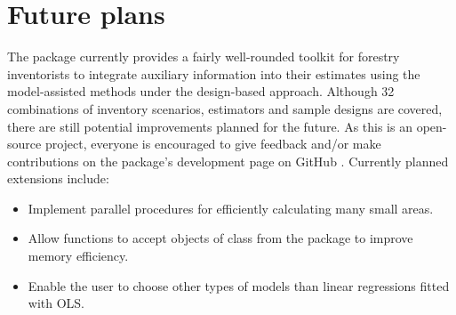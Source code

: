 \documentclass[article]{jss}
\begin{document}
\begin{figure}[h]
\centering
{}
\end{figure}




\newpage

\section{Future plans}
\label{sec:future}

The  package currently provides a fairly well-rounded toolkit for forestry inventorists to integrate auxiliary information into their estimates using the model-assisted methods under the design-based approach.  Although 32 combinations of inventory scenarios, estimators and sample designs are covered, there are still potential improvements planned for the future. As this is an open-source project, everyone is encouraged to give feedback and/or make contributions on the package's development page on GitHub \citep{github_forestinventory}. Currently planned extensions include:

\begin{itemize}
\item Implement parallel procedures for efficiently calculating many small areas.
\item Allow functions to accept objects of class  from the  package \citep{dt2017} to improve memory efficiency.
\item Enable the user to choose other types of models than linear regressions fitted with OLS.
\end{itemize}
\end{document}
